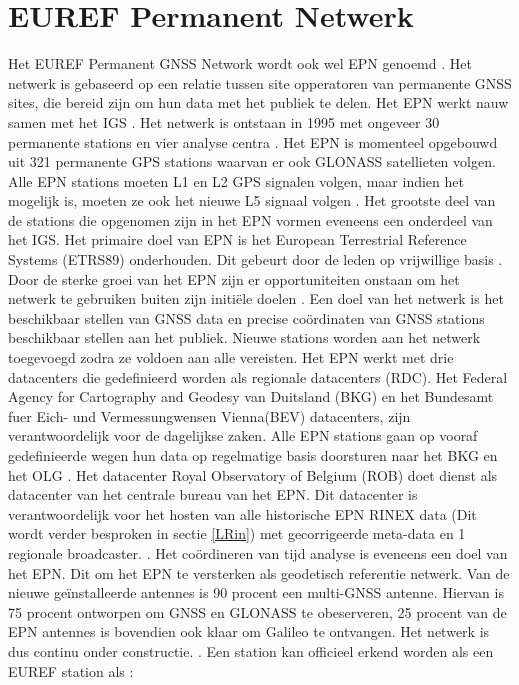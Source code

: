 \section{EUREF Permanent Netwerk}
\label{LEPN}
Het EUREF Permanent GNSS Network wordt ook wel EPN genoemd \cite{LBibEPN3,LBibEPN2,LBibEPN}. Het netwerk is gebaseerd op een relatie tussen site opperatoren van permanente GNSS sites, die bereid zijn om hun data met het publiek te delen. Het EPN werkt nauw samen met het IGS \cite{LBibEPN3}. Het netwerk is ontstaan in 1995 met ongeveer 30 permanente stations en vier analyse centra \cite{LBibEPN5}. Het EPN is momenteel opgebouwd uit 321 permanente GPS stations waarvan er ook GLONASS satellieten volgen. Alle EPN stations moeten L1 en L2 GPS signalen volgen, maar indien het mogelijk is, moeten ze ook het nieuwe L5 signaal volgen \cite{LBibEPN4}. Het grootste deel van de stations die opgenomen zijn in het EPN vormen eveneens een onderdeel van het IGS. Het primaire doel van EPN is het European Terrestrial Reference Systems (ETRS89) onderhouden. Dit gebeurt door de leden op vrijwillige basis \cite{LBibEPN, LBibEPN2}. Door de sterke groei van het EPN zijn er opportuniteiten onstaan om het netwerk te gebruiken buiten zijn initi\"ele doelen \cite{LBibEPN5}. Een doel van het netwerk is het beschikbaar stellen van GNSS data en precise co\"ordinaten van GNSS stations beschikbaar stellen aan het publiek. Nieuwe stations worden aan het netwerk toegevoegd zodra ze voldoen aan alle vereisten. Het EPN werkt met drie datacenters die gedefinieerd worden als regionale datacenters (RDC). Het Federal Agency for Cartography and Geodesy van Duitsland (BKG) en het Bundesamt fuer Eich- und Vermessungwensen Vienna(BEV)  datacenters, zijn verantwoordelijk voor de dagelijkse zaken. Alle EPN stations gaan op vooraf gedefinieerde wegen hun data op regelmatige basis doorsturen naar het BKG en het OLG \cite{LBibEPN2}. Het datacenter Royal Observatory of Belgium (ROB) doet dienst als datacenter van het centrale bureau van het EPN. Dit datacenter is verantwoordelijk voor het hosten van alle historische EPN RINEX data (Dit wordt verder besproken in sectie \ref{LRin}) met gecorrigeerde meta-data en 1 regionale broadcaster. \cite{LBibEPN2,LBibEPN3}. Het co\"ordineren van tijd analyse is eveneens een doel van het EPN. Dit om het EPN te versterken als geodetisch referentie netwerk. Van de nieuwe ge\"installeerde antennes is 90 procent een multi-GNSS antenne. Hiervan is 75 procent ontworpen om GNSS en GLONASS te obeserveren, 25 procent van de EPN antennes is bovendien ook klaar om Galileo te ontvangen. Het netwerk is dus continu onder constructie. \cite{LBibEPN3}. Een station kan officieel erkend worden als een EUREF station als \cite{LBibGNSS8}:
